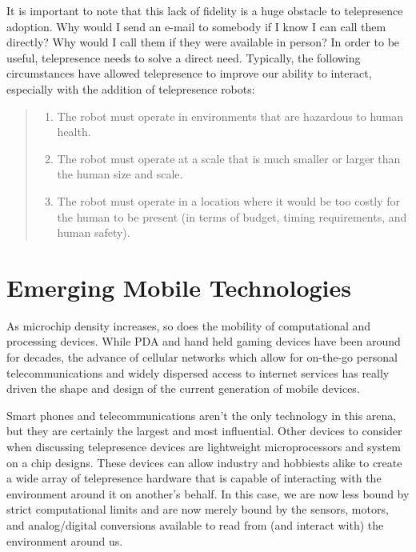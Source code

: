 \documentclass[a4paper,12pt]{report}
\begin{document}
It is important to note that this lack of fidelity is a huge obstacle to telepresence adoption. Why would I send an e-mail to somebody if I know I can call them directly? Why would I call them if they were available in person? In order to be useful, telepresence needs to solve a direct need. Typically, the following circumstances have allowed telepresence to improve our ability to interact, especially with the addition of telepresence robots:

\begin{quote}

\begin{enumerate}
\item The robot must operate in environments that are hazardous to human health.
\item The robot must operate at a scale that is much smaller or larger than the human size and scale.
\item The robot must operate in a location where it would be too costly for the human to be present (in terms of budget, timing requirements, and human safety).
\end{enumerate}
	\begin{flushright}
		\cite{726589}
	\end{flushright}
\end{quote}


\section{Emerging Mobile Technologies}
As microchip density increases, so does the mobility of computational and processing devices. While PDA and hand held gaming devices have been around for decades, the advance of cellular networks which allow for on-the-go personal telecommunications and widely dispersed access to internet services has really driven the shape and design of the current generation of mobile devices.

Smart phones and telecommunications aren't the only technology in this arena, but they are certainly the largest and most influential. Other devices to consider when discussing telepresence devices are lightweight microprocessors and system on a chip designs. These devices can allow industry and hobbiests alike to create a wide array of telepresence hardware that is capable of interacting with the environment around it on another's behalf. In this case, we are now less bound by strict computational limits and are now merely bound by the sensors, motors, and analog/digital conversions available to read from (and interact with) the environment around us.
\end{document}
